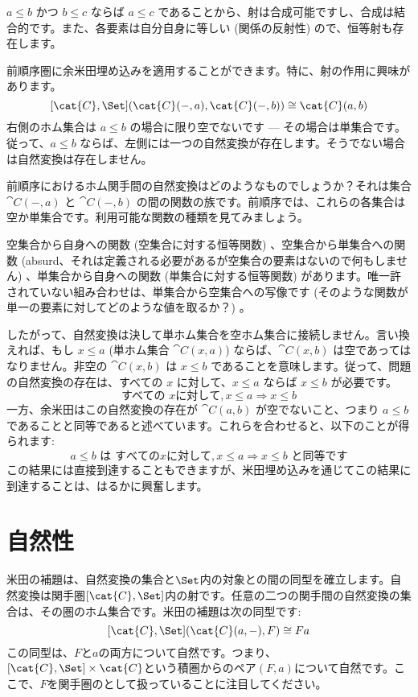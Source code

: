 $a \leqslant b$ かつ $b \leqslant c$ ならば $a \leqslant c$ であることから、射は合成可能ですし、合成は結合的です。また、各要素は自分自身に等しい (関係の反射性) ので、恒等射も存在します。

前順序圏に余米田埋め込みを適用することができます。特に、射の作用に興味があります。
\[[\cat{C}, \Set](\cat{C}(-, a), \cat{C}(-, b)) \cong \cat{C}(a, b)\]
右側のホム集合は $a \leqslant b$ の場合に限り空でないです — その場合は単集合です。従って、$a \leqslant b$ ならば、左側には一つの自然変換が存在します。そうでない場合は自然変換は存在しません。

前順序におけるホム関手間の自然変換はどのようなものでしょうか？それは集合 $\cat{C}(-, a)$ と $\cat{C}(-, b)$ の間の関数の族です。前順序では、これらの各集合は空か単集合です。利用可能な関数の種類を見てみましょう。

空集合から自身への関数 (空集合に対する恒等関数) 、空集合から単集合への関数 (absurd、それは定義される必要があるが空集合の要素はないので何もしません) 、単集合から自身への関数 (単集合に対する恒等関数) があります。唯一許されていない組み合わせは、単集合から空集合への写像です (そのような関数が単一の要素に対してどのような値を取るか？) 。

したがって、自然変換は決して単ホム集合を空ホム集合に接続しません。言い換えれば、もし $x \leqslant a$  (単ホム集合 $\cat{C}(x, a)$) ならば、$\cat{C}(x, b)$ は空であってはなりません。非空の $\cat{C}(x, b)$ は $x \leqslant b$ であることを意味します。従って、問題の自然変換の存在は、すべての $x$ に対して、$x \leqslant a$ ならば $x \leqslant b$ が必要です。
\[\text{すべての } x に対して, x \leqslant a \Rightarrow x \leqslant b\]
一方、余米田はこの自然変換の存在が $\cat{C}(a, b)$ が空でないこと、つまり $a \leqslant b$ であることと同等であると述べています。これらを合わせると、以下のことが得られます: 
\[a \leqslant b \text{ は } すべての x に対して, x \leqslant a \Rightarrow x \leqslant b \text{ と同等です}\]
この結果には直接到達することもできますが、米田埋め込みを通じてこの結果に到達することは、はるかに興奮します。

\section{自然性}

米田の補題は、自然変換の集合と$\Set$内の対象との間の同型を確立します。自然変換は関手圏$[\cat{C}, \Set]$内の射です。任意の二つの関手間の自然変換の集合は、その圏のホム集合です。米田の補題は次の同型です: 
\[[\cat{C}, \Set](\cat{C}(a, -), F) \cong F a\]
この同型は、$F$と$a$の両方について自然です。つまり、$[\cat{C}, \Set] \times \cat{C}$という積圏からのペア$(F, a)$について自然です。ここで、$F$を関手圏のとして扱っていることに注目してください。

